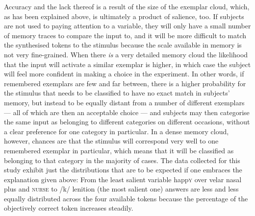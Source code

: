 Accuracy and the lack thereof is a result of the size of the exemplar cloud, which, as has been explained above, is ultimately a product of salience, too.
If subjects are not used to paying attention to a variable, they will only have a small number of memory traces to compare the input to, and it will be more difficult to match the synthesised tokens to the stimulus because the scale available in memory is not very fine-grained.
When there \emph{is} a very detailed memory cloud the likelihood that the input will activate a similar exemplar is higher, in which case the subject will feel more confident in making a choice in the experiment.
In other words, if remembered exemplars are few and far between, there is a higher probability for the stimulus that needs to be classified to have no exact match in subjects' memory, but instead to be equally distant from a number of different exemplars --- all of which are then an acceptable choice --- and subjects may then categorise the same input as belonging to different categories on different occasions, without a clear preference for one category in particular.
In a dense memory cloud, however, chances are that the stimulus will correspond very well to one remembered exemplar in particular, which means that it will be classified as belonging to that category in the majority of cases.
The data collected for this study exhibit just the distributions that are to be expected if one embraces the explanation given above: From the least salient variable happ\textsc{y} over velar nasal plus and \textsc{nurse} to /k/ lenition (the most salient one) answers are less and less equally distributed across the four available tokens because the percentage of the objectively correct token increases steadily.

